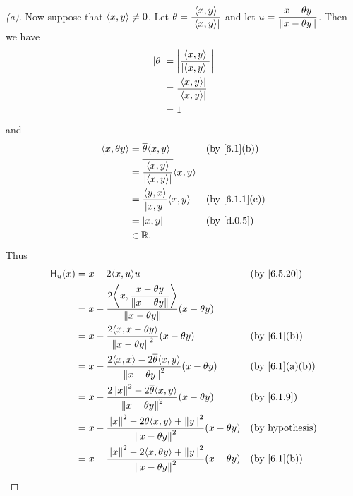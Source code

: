 \begin{proof}[(a)]
  Now suppose that \(\left\langle x, y\right\rangle \neq 0\).
  Let \(\theta = \dfrac{\left\langle x, y\right\rangle}{\left\lvert\left\langle x, y\right\rangle\right\rvert}\) and let \(u = \dfrac{x - \theta y}{\left\lVert x - \theta y\right\rVert}\).
  Then we have
  \begin{align*}
    \left\lvert\theta\right\rvert & = \left\lvert\dfrac{\left\langle x, y\right\rangle}{\left\lvert\left\langle x, y\right\rangle\right\rvert}\right\rvert \\
                 & = \dfrac{\left\lvert\left\langle x, y\right\rangle\right\rvert}{\left\lvert\left\langle x, y\right\rangle\right\rvert} \\
                 & = 1
  \end{align*}
  and
  \begin{align*}
    \inn{x, \theta y} & = \conj{\theta} \inn{x, y}                               &  & \by{6.1}[b]   \\
                      & = \conj{\dfrac{\inn{x, y}}{\abs{\inn{x, y}}}} \inn{x, y}                    \\
                      & = \dfrac{\inn{y, x}}{\abs{x, y}} \inn{x, y}              &  & \by{6.1.1}[c] \\
                      & = \abs{x, y}                                             &  & \by{d.0.5}    \\
                      & \in \R.
  \end{align*}
  Thus
  \begin{align*}
    \lt{H}_u(x) & = x - 2 \inn{x, u} u                                                                                                &  & \by{6.5.20}                \\
                & = x - \dfrac{2 \inn{x, \dfrac{x - \theta y}{\norm{x - \theta y}}}}{\norm{x - \theta y}} (x - \theta y)                                              \\
                & = x - \dfrac{2 \inn{x, x - \theta y}}{\norm{x - \theta y}^2} (x - \theta y)                                         &  & \by{6.1}[b]                \\
                & = x - \dfrac{2 \inn{x, x} - 2 \conj{\theta} \inn{x, y}}{\norm{x - \theta y}^2} (x - \theta y)                       &  & \by{6.1}[a,b]              \\
                & = x - \dfrac{2 \norm{x}^2 - 2 \conj{\theta} \inn{x, y}}{\norm{x - \theta y}^2} (x - \theta y)                       &  & \by{6.1.9}                 \\
                & = x - \dfrac{\norm{x}^2 - 2 \conj{\theta} \inn{x, y} + \norm{y}^2}{\norm{x - \theta y}^2} (x - \theta y)            &  & \text{(by hypothesis)}     \\
                & = x - \dfrac{\norm{x}^2 - 2 \inn{x, \theta y} + \norm{y}^2}{\norm{x - \theta y}^2} (x - \theta y)                   &  & \by{6.1}[b]                \\

\end{align*}
\end{proof}
